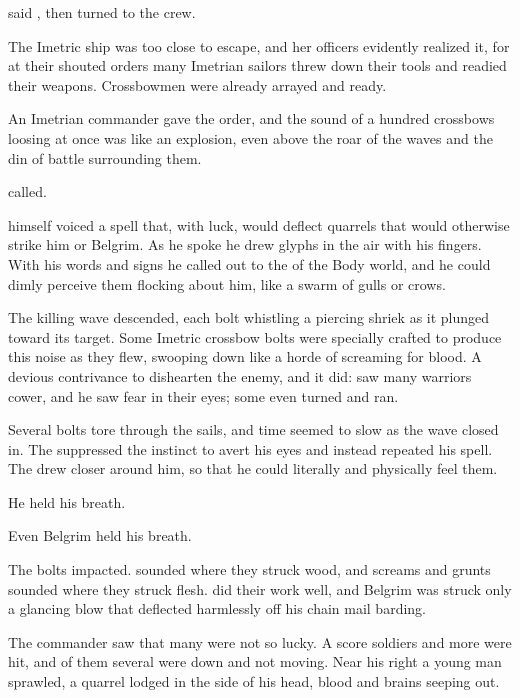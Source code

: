 said \Kufur, then turned to the crew. 

The Imetric ship was too close to escape, and her officers evidently realized it, for at their shouted orders many Imetrian sailors threw down their tools and readied their weapons. Crossbowmen were already arrayed and ready. 

An Imetrian commander gave the order, and the sound of a hundred crossbows loosing at once was like an explosion, even above the roar of the waves and the din of battle surrounding them. 

 \Kufur{} called.  

\Narkiza{} himself voiced a spell that, with luck, would deflect quarrels that would otherwise strike him or Belgrim.  As he spoke he drew glyphs in the air with his fingers.  With his words and signs he called out to the \BodyCreatures{} of the Body world, and he could dimly perceive them flocking about him, like a swarm of gulls or crows. 

The killing wave descended, each bolt whistling a piercing shriek as it plunged toward its target. Some Imetric crossbow bolts were specially crafted to produce this noise as they flew, swooping down like a horde of \daemons{} screaming for blood. A devious contrivance to dishearten the enemy, and it did: \Narkiza{} saw many warriors cower, and he saw fear in their eyes; some even turned and ran. 

Several bolts tore through the sails, and time seemed to slow as the wave closed in. The \Ashenoch{} suppressed the instinct to avert his eyes and instead repeated his spell.  The \BodyCreatures{} drew closer around him, so that he could literally and physically feel them. 

He held his breath. 

Even Belgrim held his breath. 

The bolts impacted.  sounded where they struck wood, and screams and grunts sounded where they struck flesh. \Narkizaz{} \BodyCreatures{} did their work well, and Belgrim was struck only a glancing blow that deflected harmlessly off his chain mail barding. 

The commander saw that many were not so lucky. A score soldiers and more were hit, and of them several were down and not moving. Near his right a young man sprawled, a quarrel lodged in the side of his head, blood and brains seeping out.  

